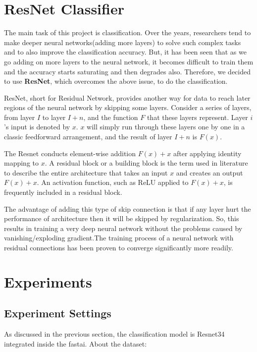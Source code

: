 \documentclass[11pt]{article}
\begin{document}
\section{ResNet Classifier}

The main task of this project is classification. Over the years, researchers tend to make deeper neural networks(adding more layers) to solve such complex tasks and to also improve the classification accuracy. But, it has been seen that as we go adding on more layers to the neural network, it becomes difficult to train them and the accuracy starts saturating and then degrades also. Therefore, we decided to use \textbf{ResNet}, which overcomes the above issue, to do the classification.

ResNet, short for Residual Network, provides another way for data to reach later regions of the neural network by skipping some layers. Consider a series of layers, from layer $I$ to layer $I + n$, and the function $F$ that these layers represent. Layer $i$'s input is denoted by $x$. $x$ will simply run through these layers one by one in a classic feedforward arrangement, and the result of layer $I + n$ is $F(x)$.

The Resnet conducts element-wise addition $F(x) + x$ after applying identity mapping to $x$. A residual block or a building block is the term used in literature to describe the entire architecture that takes an input $x$ and creates an output $F(x) + x$. An activation function, such as ReLU applied to $F(x) + x$, is frequently included in a residual block.

The advantage of adding this type of skip connection is that if any layer hurt the performance of architecture then it will be skipped by regularization. So, this results in training a very deep neural network without the problems caused by vanishing/exploding gradient.The training process of a neural network with residual connections has been proven to converge significantly more readily.


\section{Experiments}

\subsection{Experiment Settings}

As discussed in the previous section, the classification model is Resnet34 integrated inside the fastai. About the dataset:
\end{document}
